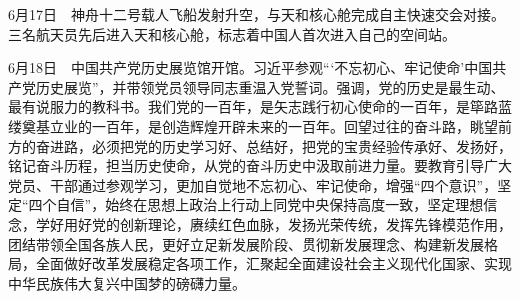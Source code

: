 \documentclass[10pt,a4paper,twocolumn]{book}
\begin{document}
6月17日　神舟十二号载人飞船发射升空，与天和核心舱完成自主快速交会对接。三名航天员先后进入天和核心舱，标志着中国人首次进入自己的空间站。

6月18日　中国共产党历史展览馆开馆。习近平参观“‘不忘初心、牢记使命’中国共产党历史展览”，并带领党员领导同志重温入党誓词。强调，党的历史是最生动、最有说服力的教科书。我们党的一百年，是矢志践行初心使命的一百年，是筚路蓝缕奠基立业的一百年，是创造辉煌开辟未来的一百年。回望过往的奋斗路，眺望前方的奋进路，必须把党的历史学习好、总结好，把党的宝贵经验传承好、发扬好，铭记奋斗历程，担当历史使命，从党的奋斗历史中汲取前进力量。要教育引导广大党员、干部通过参观学习，更加自觉地不忘初心、牢记使命，增强“四个意识”，坚定“四个自信”，始终在思想上政治上行动上同党中央保持高度一致，坚定理想信念，学好用好党的创新理论，赓续红色血脉，发扬光荣传统，发挥先锋模范作用，团结带领全国各族人民，更好立足新发展阶段、贯彻新发展理念、构建新发展格局，全面做好改革发展稳定各项工作，汇聚起全面建设社会主义现代化国家、实现中华民族伟大复兴中国梦的磅礴力量。
\end{document}
